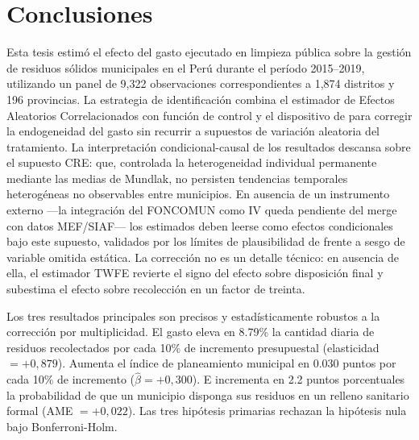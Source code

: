 
\section{Conclusiones}
\label{sec:conclusiones}

Esta tesis estimó el efecto del gasto ejecutado en limpieza pública sobre la gestión de residuos sólidos municipales en el Perú durante el período 2015--2019, utilizando un panel de 9,322 observaciones correspondientes a 1,874 distritos y 196 provincias. La estrategia de identificación combina el estimador de Efectos Aleatorios Correlacionados con función de control \citep{Wooldridge2015} y el dispositivo de \citet{Mundlak1978} para corregir la endogeneidad del gasto sin recurrir a supuestos de variación aleatoria del tratamiento. La interpretación condicional-causal de los resultados descansa sobre el supuesto CRE: que, controlada la heterogeneidad individual permanente mediante las medias de Mundlak, no persisten tendencias temporales heterogéneas no observables entre municipios. En ausencia de un instrumento externo ---la integración del FONCOMUN como IV queda pendiente del merge con datos MEF/SIAF--- los estimados deben leerse como efectos condicionales bajo este supuesto, validados por los límites de plausibilidad de \citet{Oster2019} frente a sesgo de variable omitida estática. La corrección no es un detalle técnico: en ausencia de ella, el estimador TWFE revierte el signo del efecto sobre disposición final y subestima el efecto sobre recolección en un factor de treinta.

Los tres resultados principales son precisos y estadísticamente robustos a la corrección por multiplicidad. El gasto eleva en 8.79\% la cantidad diaria de residuos recolectados por cada 10\% de incremento presupuestal (elasticidad $= +0{,}879$). Aumenta el índice de planeamiento municipal en 0.030 puntos por cada 10\% de incremento ($\hat{\beta} = +0{,}300$). E incrementa en 2.2 puntos porcentuales la probabilidad de que un municipio disponga sus residuos en un relleno sanitario formal (AME $= +0{,}022$). Las tres hipótesis primarias rechazan la hipótesis nula bajo Bonferroni-Holm.


